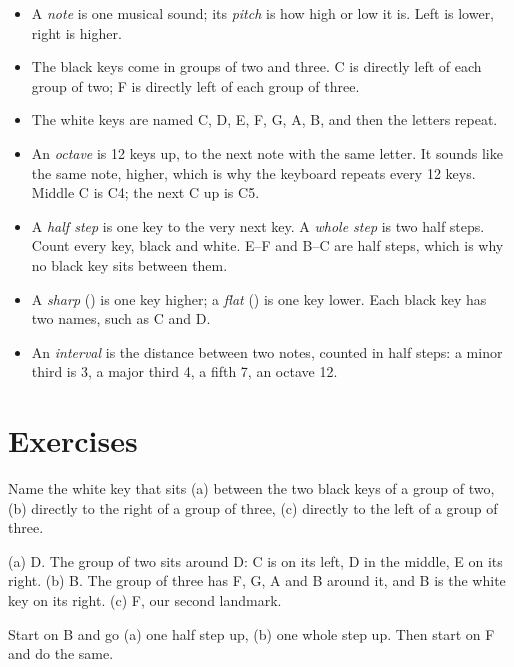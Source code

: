 \begin{summarybox}
\begin{itemize}
  \item A \emph{note} is one musical sound; its \emph{pitch} is how high or low it is. Left is lower, right is higher.
  \item The black keys come in groups of two and three. C is directly left of each group of two; F is directly left of each group of three.
  \item The white keys are named C, D, E, F, G, A, B, and then the letters repeat.
  \item An \emph{octave} is 12 keys up, to the next note with the same letter. It sounds like the same note, higher, which is why the keyboard repeats every 12 keys. Middle C is C4; the next C up is C5.
  \item A \emph{half step} is one key to the very next key. A \emph{whole step} is two half steps. Count every key, black and white. E--F and B--C are half steps, which is why no black key sits between them.
  \item A \emph{sharp} (\sh) is one key higher; a \emph{flat} (\fl) is one key lower. Each black key has two names, such as C\sh{} and D\fl.
  \item An \emph{interval} is the distance between two notes, counted in half steps: a minor third is 3, a major third 4, a fifth 7, an octave 12.
\end{itemize}
\end{summarybox}

\section*{Exercises}

\begin{exercise}
Name the white key that sits (a) between the two black keys of a group of two, (b) directly to the right of a group of three, (c) directly to the left of a group of three.
\end{exercise}

\begin{answerbox}
(a) D. The group of two sits around D: C is on its left, D in the middle, E on its right. (b) B. The group of three has F, G, A and B around it, and B is the white key on its right. (c) F, our second landmark.
\end{answerbox}

\begin{exercise}
Start on B and go (a) one half step up, (b) one whole step up. Then start on F and do the same.
\end{exercise}

